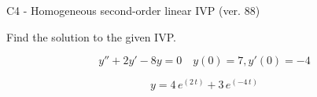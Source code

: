 \begin{exercise}
  \begin{exerciseTitle}C4 - Homogeneous second-order linear IVP (ver. 88)\end{exerciseTitle}
  \begin{exerciseStatement}
    
Find the solution to the given IVP.

    
\[y''+2y'-8y = 0 \hspace{1em} y(0) = 7 , y'(0) = -4\]

  \end{exerciseStatement}
  \begin{exerciseAnswer}
    
\[y= 4 \, e^{\left(2 \, t\right)} + 3 \, e^{\left(-4 \, t\right)}\]

  \end{exerciseAnswer}
\end{exercise}